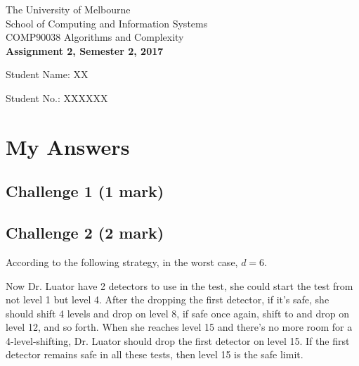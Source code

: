 \documentclass[11pt]{article}
\begin{document}
\begin{center}
{\sc The University of Melbourne
\\
School of Computing and Information Systems
\\
COMP90038 Algorithms and Complexity}
\bigskip \\
{\Large\bf Assignment 2, Semester 2, 2017}
\bigskip \\
{Student Name: XX

Student No.: XXXXXX}
\end{center}
\section*{My Answers}
\subsection*{Challenge 1 \hfill {\small (1 mark)}}
\begin{center}
\end{center}

\subsection*{Challenge 2 \hfill {\small (2 mark)}}
According to the following strategy, in the worst case, $d = 6$.

Now Dr. Luator have 2 detectors to use in the test, she could start the test from not level 1
but level 4. After the dropping the first detector, if it's safe, she should shift 4 levels and 
drop on level 8, if safe once again, shift to and drop on level 12, and so forth.
When she reaches level 15 and there's no more room for a 4-level-shifting,
Dr. Luator should drop the first detector on level 15. If the first detector remains safe in all
these tests, then level 15 is the safe limit.
\end{document}
